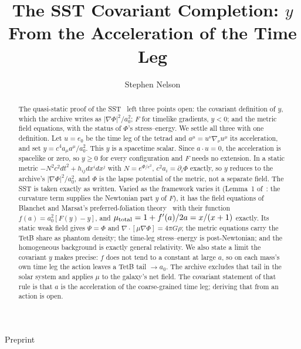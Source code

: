 \documentclass[twocolumn]{iopjournal}
\renewcommand{\articletype}[1]{%
  {\vspace*{-8mm}\noindent \Large \sf Preprint}\par
  \vspace*{6mm}\noindent{\scriptsize \sf{\bfseries \MakeUppercase{#1}}}}
\begin{document}
\articletype{Supplementary Material}

\title{The SST Covariant Completion: $y$ From the Acceleration of the Time Leg}

\author{Stephen Nelson}



\begin{abstract}
The quasi-static proof of the SST~\cite{NelsonPqs} left three points
open: the covariant definition of $y$, which the archive writes as
$|\nabla\Phi|^2/a_0^2$; $F$ for timelike gradients, $y<0$; and the
metric field equations, with the status of $\Phi$'s stress--energy.
We settle all three with one definition. Let $u = e_0$ be the time
leg of the tetrad and $a^\mu = u^\nu\nabla_\nu u^\mu$ its
acceleration, and set $y = c^4 a_\mu a^\mu/a_0^2$. This $y$ is a
spacetime scalar. Since $a\cdot u = 0$, the acceleration is spacelike
or zero, so $y \ge 0$ for every configuration and $F$ needs no
extension. In a static metric $-N^2c^2dt^2 + h_{ij}dx^idx^j$ with
$N = e^{\Phi/c^2}$, $c^2 a_i = \partial_i\Phi$ exactly, so $y$ reduces
to the archive's $|\nabla\Phi|^2/a_0^2$, and $\Phi$ is the lapse
potential of the metric, not a separate field. The SST is taken
exactly as written. Varied as the framework varies it (Lemma~1
of~\cite{NelsonPqs}: the curvature term supplies the Newtonian part
$y$ of $F$), it has the field equations of Blanchet and Marsat's
preferred-foliation theory~\cite{BM2011,BM2012} with their function
$f(a) = a_0^2[F(y) - y]$, and $\mu_{\rm total} = 1 + f'(a)/2a =
x/(x+1)$ exactly. Its static weak field gives $\Psi =
\Phi$ and $\nabla\cdot[\mu\nabla\Phi] = 4\pi G\rho$; the metric
equations carry the TetB share as phantom density; the time-leg
stress--energy is post-Newtonian; and the homogeneous background is
exactly general relativity. We also state a limit the covariant $y$
makes precise: $f$ does not tend to a constant at large $a$, so on
each mass's own time leg the action leaves a TetB tail $\to a_0$. The
archive excludes that tail in the solar system and applies $\mu$ to
the galaxy's net field. The covariant statement of that rule is that
$a$ is the acceleration of the coarse-grained time leg; deriving that
from an action is open.
\end{abstract}

\end{document}
